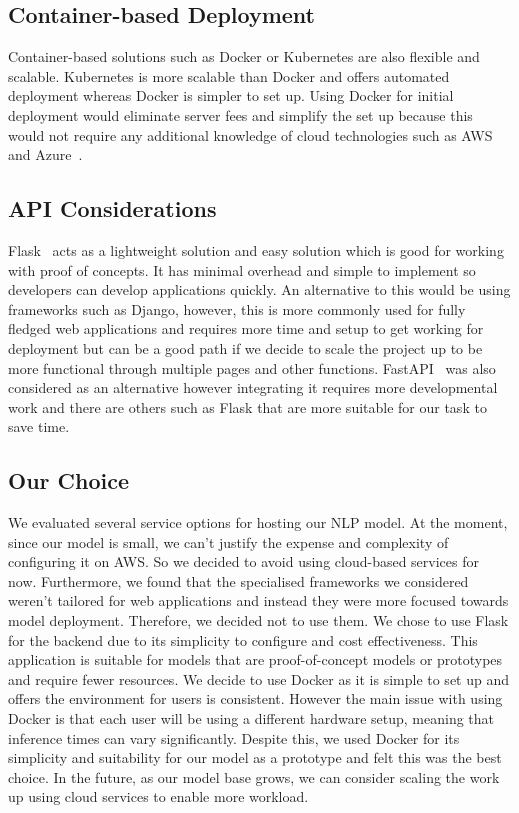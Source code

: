 \documentclass{surreydissertation}
\begin{document}
\subsection{Container-based Deployment}
Container-based solutions such as Docker or Kubernetes are also flexible and scalable. Kubernetes is more scalable than Docker and offers automated deployment whereas Docker is simpler to set up. Using Docker for initial deployment would eliminate server fees and simplify the set up because this would not require any additional knowledge of cloud technologies such as AWS and Azure~\cite{azure}.

\subsection{API Considerations}
Flask~\cite{flask} acts as a lightweight solution and easy solution which is good for working with proof of concepts. It has minimal overhead and simple to implement so developers can develop applications quickly. An alternative to this would be using frameworks such as Django, however, this is more commonly used for fully fledged web applications and requires more time and setup to get working for deployment but can be a good path if we decide to scale the project up to be more functional through multiple pages and other functions. FastAPI~\cite{fastapi} was also considered as an alternative however integrating it requires more developmental work and there are others such as Flask that are more suitable for our task to save time.

\subsection{Our Choice}
We evaluated several service options for hosting our NLP model. At the moment, since our model is small, we can't justify the expense and complexity of configuring it on AWS. So we decided to avoid using cloud-based services for now. Furthermore, we found that the specialised frameworks we considered weren't tailored for web applications and instead they were more focused towards model deployment. Therefore, we decided not to use them. We chose to use Flask for the backend due to its simplicity to configure and cost effectiveness. This application is suitable for models that are proof-of-concept models or prototypes and require fewer resources. We decide to use Docker as it is simple to set up and offers the environment for users is consistent. However the main issue with using Docker is that each user will be using a different hardware setup, meaning that inference times can vary significantly. Despite this, we used Docker for its simplicity and suitability for our model as a prototype and felt this was the best choice. In the future, as our model base grows, we can consider scaling the work up using cloud services to enable more workload. 
\end{document}

